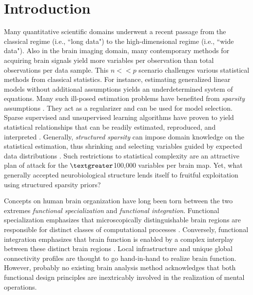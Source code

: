 \documentclass{article}
\begin{document}
\section{Introduction}
Many quantitative scientific domains underwent a
recent passage from the classical regime (i.e., ``long data")  to
the high-dimensional regime (i.e., ``wide data").
Also in the brain imaging domain,
many contemporary methods for acquiring brain signals yield
more variables per observation than
total observations per data sample.
This \(n << p\) scenario challenges various statistical methods from
classical statistics.
For instance,
estimating generalized linear models without additional assumptions
yields an underdetermined system of equations.
%
Many such ill-posed estimation problems
have benefited from
\textit{sparsity} assumptions
\cite{hastie2015statistical}.
They act as a 
regularizer and can be used for model selection.
Sparse supervised and unsupervised
learning algorithms have proven to yield
statistical relationships that can be readily
estimated, reproduced, and interpreted
\cite{giraud2014introduction}.
%
Generally, \textit{structured sparsity} can impose
domain knowledge on the 
statistical estimation,
thus shrinking and selecting variables guided by
expected data distributions
\cite{bach2012optimization}.
Such restrictions to statistical complexity
are an attractive plan of attack
for the $\textgreater$100,000 variables per brain map.
Yet, what generally accepted neurobiological structure lends itself
to fruitful exploitation using structured sparsity priors?



Concepts on human brain organization have long been torn
between the two extremes
\textit{functional specialization} and \textit{functional integration}.
Functional specialization emphasizes that microscopically distinguishable
brain regions are responsible for distinct classes of computational 
processes
\cite{kanwisher2010functional}.
Conversely, functional integration emphasizes that brain function
is enabled by a complex interplay between these
distinct brain regions \cite{sporns14nn}.
%
Local
infrastructure
and unique global connectivity profiles are thought to go hand-in-hand
to realize brain function.
%
However,
probably no existing brain analysis method acknowledges that
both functional design principles are inextricably involved
in the realization of mental operations.
\end{document}
